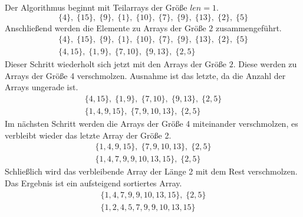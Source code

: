 \noindent
Der Algorithmus beginnt mit Teilarrays der Größe $len=1$.
\begin{equation*}
	\{4\},\;\{15\},\;\{9\},\;\{1\},\;\{10\},\;\{7\},\;\{9\},\;\{13\},\;\{2\},\;\{5\}
\end{equation*}
\newpage
\noindent
Anschließend werden die Elemente zu Arrays der Größe $2$ zusammengeführt.
\begin{gather*}
	\{4\},\;\{15\},\;\{9\},\;\{1\},\;\{10\},\;\{7\},\;\{9\},\;\{13\},\;\{2\},\;\{5\}\\
	\{4, 15\},\;\{1, 9\},\;\{7, 10\},\;\{9, 13\},\;\{2, 5\}
\end{gather*}
\noindent
Dieser Schritt wiederholt sich jetzt mit den Arrays der Größe $2$. Diese werden zu Arrays der Größe 4 verschmolzen. Ausnahme ist das letzte, da die Anzahl der Arrays ungerade ist.
\begin{gather*}
	\{4, 15\},\;\{1, 9\},\;\{7, 10\},\;\{9, 13\},\;\{2, 5\}\\
	\{1, 4, 9, 15\},\;\{7, 9, 10, 13\},\;\{2, 5\}
\end{gather*}
\noindent
Im nächsten Schritt werden die Arrays der Größe 4 miteinander verschmolzen, es verbleibt wieder das letzte Array der Größe 2.
\begin{gather*}
	\{1, 4, 9, 15\},\;\{7, 9, 10, 13\},\;\{2, 5\}\\
	\{1, 4, 7, 9, 9, 10, 13, 15\},\;\{2, 5\}
\end{gather*}
\noindent
Schließlich wird das verbleibende Array der Länge 2 mit dem Rest verschmolzen. Das Ergebnis ist ein aufsteigend sortiertes Array.
\begin{gather*}
	\{1, 4, 7, 9, 9, 10, 13, 15\},\;\{2, 5\}\\
	\{1, 2, 4, 5, 7, 9, 9, 10, 13, 15\}
\end{gather*}